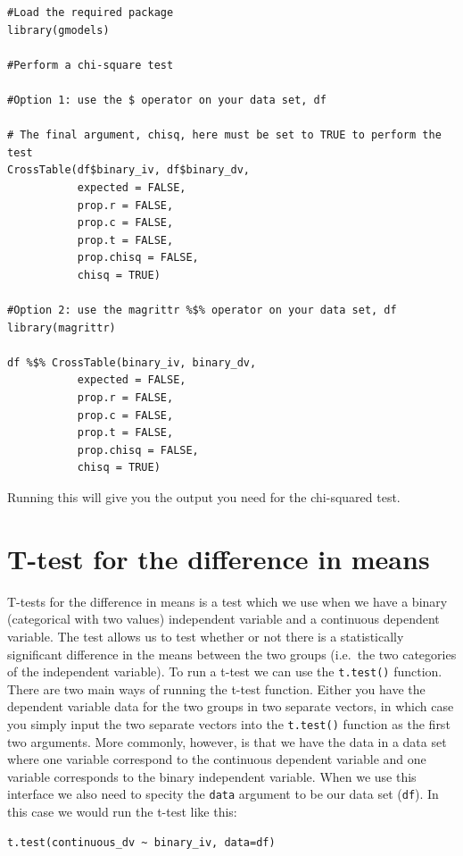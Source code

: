 \documentclass[
]{book}
\begin{document}
\begin{verbatim}
#Load the required package
library(gmodels)

#Perform a chi-square test

#Option 1: use the $ operator on your data set, df

# The final argument, chisq, here must be set to TRUE to perform the test
CrossTable(df$binary_iv, df$binary_dv,
           expected = FALSE,
           prop.r = FALSE,
           prop.c = FALSE,
           prop.t = FALSE,
           prop.chisq = FALSE,
           chisq = TRUE) 
          
#Option 2: use the magrittr %$% operator on your data set, df
library(magrittr)

df %$% CrossTable(binary_iv, binary_dv,
           expected = FALSE,
           prop.r = FALSE,
           prop.c = FALSE,
           prop.t = FALSE,
           prop.chisq = FALSE,
           chisq = TRUE) 
\end{verbatim}

Running this will give you the output you need for the chi-squared test.

\hypertarget{t-test-for-the-difference-in-means}{%
\section{T-test for the difference in means}\label{t-test-for-the-difference-in-means}}

T-tests for the difference in means is a test which we use when we have a binary (categorical with two values) independent variable and a continuous dependent variable. The test allows us to test whether or not there is a statistically significant difference in the means between the two groups (i.e.~the two categories of the independent variable). To run a t-test we can use the \texttt{t.test()} function. There are two main ways of running the t-test function. Either you have the dependent variable data for the two groups in two separate vectors, in which case you simply input the two separate vectors into the \texttt{t.test()} function as the first two arguments. More commonly, however, is that we have the data in a data set where one variable correspond to the continuous dependent variable and one variable corresponds to the binary independent variable. When we use this interface we also need to specity the \texttt{data} argument to be our data set (\texttt{df}). In this case we would run the t-test like this:

\begin{verbatim}
t.test(continuous_dv ~ binary_iv, data=df)
\end{verbatim}
\end{document}
